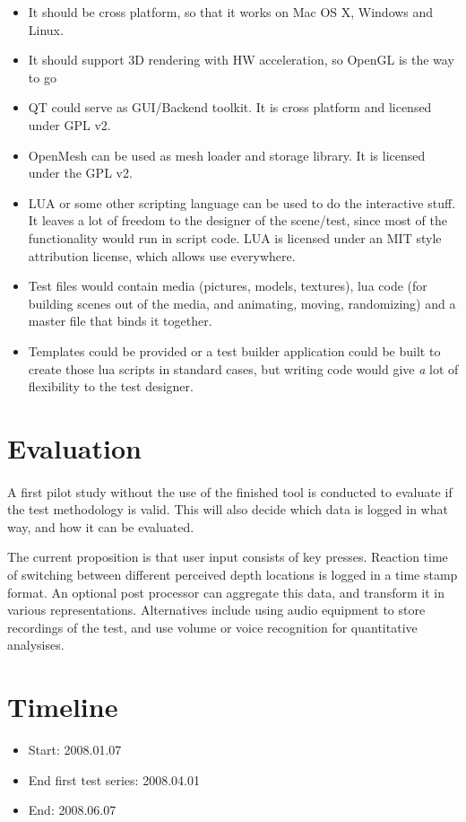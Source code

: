 \documentclass[11pt]{scrartcl}
\begin{document}
\begin{multicols}{2}
\begin{itemize}
\item It should be cross platform, so that it works on Mac OS X, Windows and Linux.
\item It should support 3D rendering with HW acceleration, so OpenGL is the way to go
\item QT could serve as GUI/Backend toolkit. It is cross platform and licensed under GPL v2.
\item OpenMesh can be used as mesh loader and storage library. It is licensed under the GPL v2.
\item LUA or some other scripting language can be used to do the interactive stuff. It leaves a lot of freedom to the designer of the scene/test, since most of the functionality would run in script code. LUA is licensed under an MIT style attribution license, which allows use everywhere.
\item Test files would contain media (pictures, models, textures), lua code (for building scenes out of the media, and animating, moving, randomizing) and a master file that binds it together.
\item Templates could be provided or a test builder application could be built to create those lua scripts in standard cases, but writing code would give {\textit a lot} of flexibility to the test designer.
\end{itemize}

\section{Evaluation}
\paragraph{}
A first pilot study without the use of the finished tool is conducted to evaluate if the test methodology is valid. This will also decide which data is logged in what way, and how it can be evaluated.

The current proposition is that user input consists of key presses. Reaction time of switching between different perceived depth locations is logged in a time stamp format. An optional post processor can aggregate this data, and transform it in various representations. Alternatives include using audio equipment to store recordings of the test, and use volume or voice recognition for quantitative analysises. 

\section{Timeline}
\begin{itemize}
\item Start: 2008.01.07
\item End first test series: 2008.04.01
\item End: 2008.06.07
\end{itemize}

\end{multicols}
\end{document}
